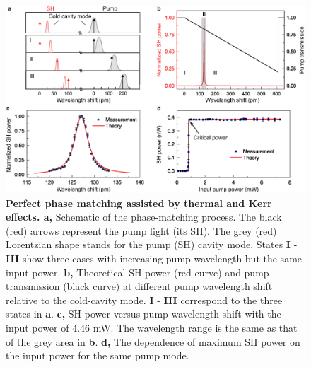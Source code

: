 \documentclass[a4paper,8pt,hyperref, twocolumn, aps, prl]{article}
\begin{document}
\begin{figure}[!ht]
\centering
\includegraphics[width=17cm]{try_ed3.eps}
\caption{\textbf{Perfect phase matching assisted by thermal and Kerr effects. a, }Schematic of the phase-matching process.
The black (red) arrows represent the pump light (its SH). The grey (red) Lorentzian shape stands for the pump (SH) cavity mode. States
\textbf{I}  - \textbf{III}  show three cases with increasing pump wavelength but the same input power. 
\textbf{b, }Theoretical SH power (red curve) and pump transmission (black curve) at different pump wavelength shift relative to the cold-cavity mode. \textbf{I} - \textbf{III} correspond to the three states in \textbf{a}. %
\textbf{c, }SH power versus pump wavelength shift with the input power of 4.46 mW. The wavelength range is the same as that of the grey area in \textbf{b}.
\textbf{d, }The dependence of maximum SH power on the input power for the same pump mode.}
\label{pic:Fig2}
\end{figure}
\end{document}
